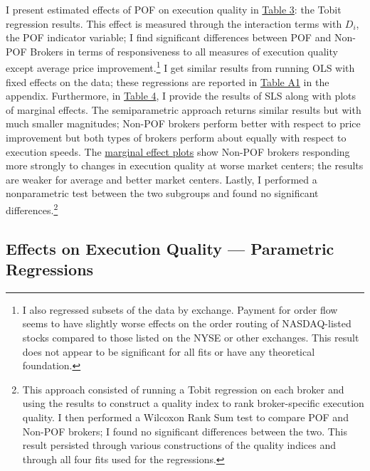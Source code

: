 \documentclass[12pt,a4paper]{extarticle}
\begin{document}
	 I present estimated effects of POF on execution quality in \hyperref[table:3]{Table 3}: the Tobit regression results. This effect is measured through the interaction terms with $D_i$, the POF indicator variable; I find significant differences between POF and Non-POF Brokers in terms of responsiveness to all measures of execution quality except average price improvement.\footnote{ I also regressed subsets of the data by exchange. Payment for order flow seems to have slightly worse effects on the order routing of NASDAQ-listed stocks compared to those listed on the NYSE or other exchanges. This result does not appear to be significant for all fits or have any theoretical foundation.}  I get similar results from running OLS with fixed effects on the data; these regressions are reported in \hyperref[table:a1]{Table A1} in the appendix. Furthermore, in \hyperref[table:4]{Table 4}, I provide the results of SLS along with plots of marginal effects. The semiparametric approach returns similar results but with much smaller magnitudes; Non-POF brokers perform better with respect to price improvement but both types of brokers perform about equally with respect to execution speeds. The \hyperref[fig:meplots]{marginal effect plots} show Non-POF brokers responding more strongly to changes in execution quality at worse market centers; the results are weaker for average and better market centers. Lastly, I performed a nonparametric test between the two subgroups and found no significant differences.\footnote{ This approach consisted of running a Tobit regression on each broker and using the results to construct a quality index to rank broker-specific execution quality. I then performed a Wilcoxon Rank Sum test to compare POF and Non-POF brokers; I found no significant differences between the two. This result persisted through various constructions of the quality indices and through all four fits used for the regressions.}



\subsection{Effects on Execution Quality --- Parametric Regressions}
\end{document}
